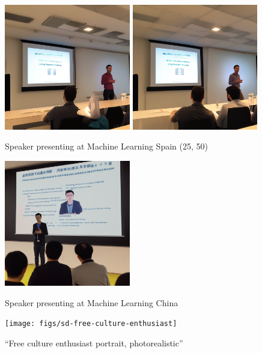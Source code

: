 \documentclass[17pt,aspectratio=169,hyperref={pdfusetitle,colorlinks,allcolors=olive}]{beamer}
\begin{document}
\begin{frame}[fragile]

  \includegraphics[width=5.5cm]{figs/sd-machine-learning-spain-25}
  \includegraphics[width=5.5cm]{figs/sd-machine-learning-spain-50}

  {\small
  Speaker presenting at Machine Learning Spain (25, 50)
}  
\end{frame}

\begin{frame}[fragile]

  \includegraphics[width=5.5cm]{figs/sd-machine-learning-china-50}

  {\small
  Speaker presenting at Machine Learning China
}  
\end{frame}

\begin{frame}[fragile]

  \texttt{[image: figs/sd-free-culture-enthusiast]}

  {\small
  ``Free culture enthusiast portrait, photorealistic''
}  
\end{frame}
\end{document}
